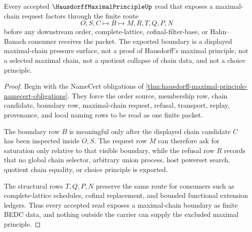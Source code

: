 \begin{theorem}
\label{thm:hausdorff-maximal-principle-chain-boundary}
Every accepted $\HausdorffMaximalPrincipleUp$ read that exposes a maximal-chain request factors through the finite route
$$
O,S,C \longmapsto B \longmapsto M,R,T,Q,P,N
$$
before any downstream order, complete-lattice, cofinal-filter-base, or Hahn--Banach consumer receives the packet. The exported boundary is a displayed maximal-chain pressure surface, not a proof of Hausdorff's maximal principle, not a selected maximal chain, not a quotient collapse of chain data, and not a choice principle.
\end{theorem}
\begin{proof}
Begin with the NameCert obligations of \autoref{thm:hausdorff-maximal-principle-namecert-obligations}. They force the order source, membership row, chain candidate, boundary row, maximal-chain request, refusal, transport, replay, provenance, and local naming rows to be read as one finite packet.

The boundary row $B$ is meaningful only after the displayed chain candidate $C$ has been inspected inside $O,S$. The request row $M$ can therefore ask for saturation only relative to that visible boundary, while the refusal row $R$ records that no global chain selector, arbitrary union process, host powerset search, quotient chain equality, or choice principle is exported.

The structural rows $T,Q,P,N$ preserve the same route for consumers such as complete-lattice schedules, cofinal replacement, and bounded functional extension ledgers. Thus every accepted read exposes a maximal-chain boundary as finite BEDC data, and nothing outside the carrier can supply the excluded maximal principle.
\end{proof}




